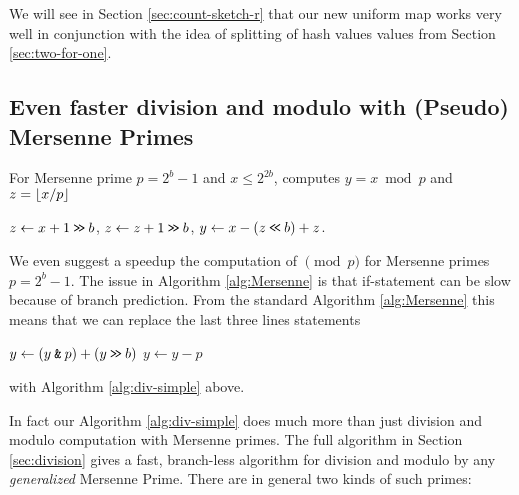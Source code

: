 We will see in Section \ref{sec:count-sketch-r} that our new uniform map
works very well in conjunction with the idea of splitting of hash values 
values from Section \ref{sec:two-for-one}.




\subsection{Even faster division and modulo with (Pseudo) Mersenne Primes}
%
\begin{algorithm}\label{alg:div-simple}
   \caption{For Mersenne prime $p=2^b-1$ and $x\leq 2^{2b}$, computes
   $y=x\bmod p$ and $z=\lfloor {x/p} \rfloor$}
   \begin{algorithmic}
      \State $z \gets x+1 \mathbin{\texttt{>\!>}} b$,
      \State $z \gets z+1 \mathbin{\texttt{>\!>}} b$,
      \State $y \gets x - (z \mathbin{\texttt{<\!<}} b) + z$.
   \end{algorithmic}
\end{algorithm}
%
We even suggest a speedup the computation of $\pmod p$ for Mersenne primes
$p=2^b-1$. The issue in Algorithm \ref{alg:Mersenne} is that
if-statement can be slow because of branch prediction.
From the standard Algorithm \ref{alg:Mersenne} this means that we can
replace the last three lines statements
\begin{algorithmic}
   \State $y \gets (y\mathbin{\texttt{\&}} p)+(y\mathbin{\texttt{>\!>}} b)$
      \State $y\gets y-p$
   \EndIf
\end{algorithmic}
with Algorithm \ref{alg:div-simple} above.

\vspace{1em}

In fact our Algorithm \ref{alg:div-simple} does much more than just division and modulo computation with Mersenne primes.
The full algorithm in Section \ref{sec:division} gives a fast, branch-less algorithm for division and modulo by any \emph{generalized} Mersenne Prime.
There are in general two kinds of such primes:

